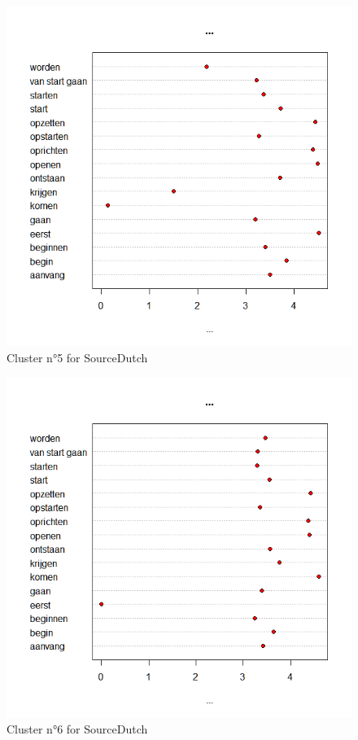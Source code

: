 \begin{figure}
\includegraphics[height=.4\textheight]{figures/Vandevoorde2-img60.png}
\caption{\label{fig:4:60}  Cluster n°5 for SourceDutch}
\end{figure}

\begin{figure}
\includegraphics[height=.4\textheight]{figures/Vandevoorde2-img61.png}
\caption{\label{fig:4:61a}  Cluster n°6 for SourceDutch}
\end{figure}


